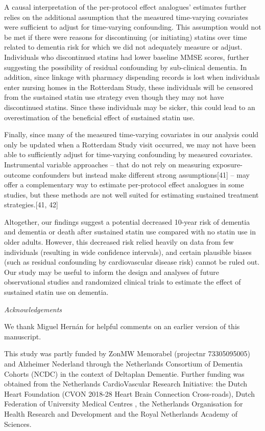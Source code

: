 \documentclass[
]{book}
\begin{document}
A causal interpretation of the per-protocol effect analogues' estimates further relies on the additional assumption that the measured time-varying covariates were sufficient to adjust for time-varying confounding. This assumption would not be met if there were reasons for discontinuing (or initiating) statins over time related to dementia risk for which we did not adequately measure or adjust. Individuals who discontinued statins had lower baseline MMSE scores, further suggesting the possibility of residual confounding by sub-clinical dementia. In addition, since linkage with pharmacy dispending records is lost when individuals enter nursing homes in the Rotterdam Study, these individuals will be censored from the sustained statin use strategy even though they may not have discontinued statins. Since these individuals may be sicker, this could lead to an overestimation of the beneficial effect of sustained statin use.

Finally, since many of the measured time-varying covariates in our analysis could only be
updated when a Rotterdam Study visit occurred, we may not have been able to sufficiently adjust for time-varying confounding by measured covariates. Instrumental variable approaches -- that do not rely on measuring exposure-outcome confounders but instead make different strong assumptions{[}41{]} -- may offer a complementary way to estimate per-protocol effect analogues in some studies, but these methods are not well suited for estimating sustained treatment strategies.{[}41, 42{]}

Altogether, our findings suggest a potential decreased 10-year risk of dementia and dementia or death after sustained statin use compared with no statin use in older adults. However, this decreased risk relied heavily on data from few individuals (resulting in wide confidence intervals), and certain plausible biases (such as residual confounding by cardiovascular disease risk) cannot be ruled out. Our study may be useful to inform the design and analyses of future observational studies and randomized clinical trials to estimate the effect of sustained statin use on dementia.

\emph{Acknowledgements}

We thank Miguel Hernán for helpful comments on an earlier version of this manuscript.

This study was partly funded by ZonMW Memorabel (projectnr 73305095005) and Alzheimer Nederland through the Netherlands Consortium of Dementia Cohorts (NCDC) in the context of Deltaplan Dementie. Further funding was obtained from the Netherlands CardioVascular Research Initiative: the Dutch Heart Foundation (CVON 2018-28 Heart Brain Connection Cross-roads), Dutch Federation of University Medical Centres , the Netherlands Organisation for Health Research and Development and the Royal Netherlands Academy of Sciences.
\end{document}
